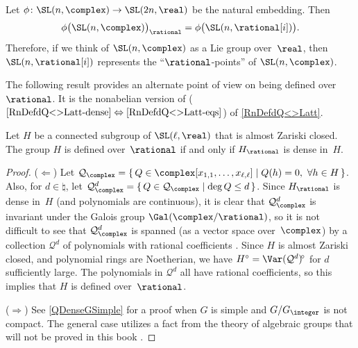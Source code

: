 
\begin{eg} \label{SLnCQ}
 Let $\phi \colon \SL(n,\complex) \to \SL(2n,\real)$ be the
natural embedding. Then
 $$ \phi \bigl( \SL(n,\complex) \bigr)_{\rational} 
 = \phi \bigl( \SL(n,\rational[i]) \bigr) .$$
 Therefore, if we think of $\SL(n,\complex)$ as a Lie group
over~$\real$, then $\SL(n,\rational[i])$ represents the
``$\rational$-points'' of $\SL(n,\complex)$.
 \end{eg}

The following result provides an alternate point of view on
being defined over~$\rational$.
It is the nonabelian version of  ($\ref{RnDefdQ<>Latt-dense} \Leftrightarrow \ref{RnDefdQ<>Latt-eqs}$) of \cref{RnDefdQ<>Latt}.

\begin{prop} \label{QptsDense}
 Let $H$ be a connected subgroup of\/ $\SL(\ell,\real)$ that
is almost Zariski closed. The group $H$ is defined
over\/~$\rational$ if and only if $H_{\rational}$ is dense
in~$H$.
 \end{prop}

\begin{proof}
($\Leftarrow$) Let $\mathcal{Q}_\complex = 
	\{\, Q \in \complex[x_{1,1},\ldots,x_{\ell,\ell}] \mid Q(h) = 0, \ \forall h \in H \,\}$. Also, for $d \in \natural$, let $\mathcal{Q}_\complex^d = \{\, Q \in \mathcal{Q}_\complex \mid \deg Q \le d \,\}$. Since $H_\rational$ is dense in~$H$ (and polynomials are continuous), it is clear that $\mathcal{Q}_\complex^d$ is invariant under the Galois group $\Gal(\complex/\rational)$, so it is not difficult to see that $\mathcal{Q}_\complex^d$ is spanned (as a vector space over~$\complex$) by a collection $\mathcal{Q}^d$ of polynomials with rational coefficients . Since $H$ is almost Zariski closed, and polynomial rings are Noetherian, we have $H^\circ = \Var(\mathcal{Q}^d)\!^\circ$ for $d$ sufficiently large. The polynomials in $\mathcal{Q}^d$ all have rational coefficients, so this implies that $H$ is defined over~$\rational$.

($\Rightarrow$)  See \cref{QDenseGSimple} for a proof when $G$ is simple and $G/G_\integer$ is not compact. The general case utilizes a fact from the theory of algebraic groups that will not be proved in this book . 
\end{proof}

